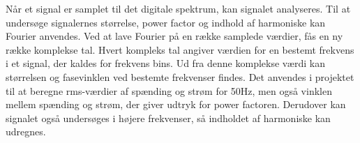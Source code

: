 Når et signal er samplet til det digitale spektrum, kan signalet analyseres. Til at undersøge signalernes størrelse, power factor og indhold af harmoniske kan Fourier anvendes. Ved at lave Fourier på en række samplede værdier, fås en ny række komplekse tal. Hvert kompleks tal angiver værdien for en bestemt frekvens i et signal, der kaldes for frekvens bins. Ud fra denne komplekse værdi kan størrelsen og fasevinklen ved bestemte frekvenser findes. Det anvendes i projektet til at beregne rms-værdier af spænding og strøm for 50Hz, men også vinklen mellem spænding og strøm, der giver udtryk for power factoren. Derudover kan signalet også undersøges i højere frekvenser, så indholdet af harmoniske kan udregnes.  

